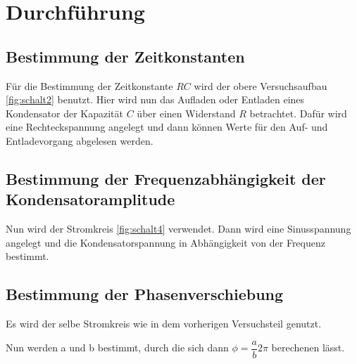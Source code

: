 \section{Durchführung}
\label{sec:Durchführung}


\subsection{Bestimmung der Zeitkonstanten}

\noindent Für die Bestimmung der Zeitkonstante $RC$ wird der obere Versuchsaufbau \ref{fig:schalt2} benutzt.
Hier wird nun das Aufladen oder Entladen eines Kondensator der Kapazität $C$ über einen Widerstand 
$R$ betrachtet. Dafür wird eine Rechteckspannung angelegt und dann können
 Werte für den Auf- und Entladevorgang abgelesen werden.

\subsection{Bestimmung der Frequenzabhängigkeit der Kondensatoramplitude}

\noindent Nun wird der Stromkreis \ref{fig:schalt4} verwendet. Dann wird eine Sinusspannung angelegt und die 
Kondensatorspannung in Abhängigkeit von der Frequenz bestimmt.

\subsection{Bestimmung der Phasenverschiebung}
Es wird der selbe Stromkreis wie in dem vorherigen Versuchsteil genutzt.

\noindent Nun werden a und b bestimmt, durch die sich dann $\phi = \dfrac{a}{b} 2\pi$ berechenen lässt.